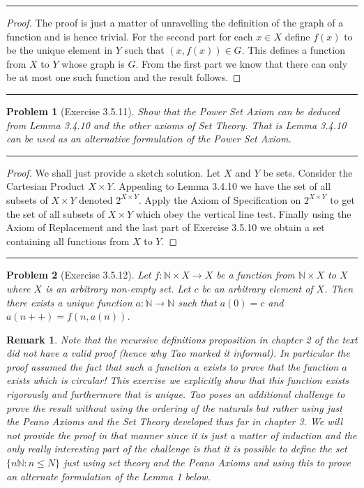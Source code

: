 \documentclass{article}
\newcommand{\lined}{\noindent\rule{\textwidth}{1pt}}
\newtheorem*{problem}{Problem}
\newtheorem*{remark}{Remark}
\begin{document}
	\lined
		\begin{proof}
			The proof is just a matter of unravelling the
			definition of the graph of a function and is hence 
			trivial. For the second part for each $x \in X$ define $f(x)$ to be the unique element in $Y$ such that
			$(x,f(x)) \in G$. This defines a function from $X$ to $Y$ whose graph is $G$. From the first part we know that there can only be at most one such function and the result follows.
		\end{proof}
	\lined
	
	\newpage
	
	\begin{problem}[Exercise 3.5.11]
		Show that the Power Set Axiom can be deduced from Lemma 3.4.10 and the other axioms of Set Theory. That is Lemma 3.4.10 can be used as an alternative formulation of the Power Set Axiom. 
	\end{problem}
	
	\lined
		\begin{proof}
			We shall just provide a sketch solution. Let $X$ and $Y$ be sets. Consider the Cartesian Product $X \times Y$. Appealing to Lemma 3.4.10 we have the set of all subsets of $X \times Y$ denoted $2^{X \times Y}$. Apply the Axiom of Specification on $2^{X \times Y}$ to get the set of all subsets of $X \times Y$ which obey the vertical line test. Finally using the Axiom of Replacement and the last part of Exercise 3.5.10 we obtain a set containing all functions from $X$ to $Y$.
		\end{proof}
	\lined
	
	\newpage
	
	\begin{problem}[Exercise 3.5.12]
		Let $f:\mathbb{N} \times X \rightarrow X$ be a function from $\mathbb{N} \times X$ to $X$ where $X$ is an arbitrary non-empty set. Let $c$ be an arbitrary element of $X$. Then there exists a unique 	function $a:\mathbb{N} \rightarrow \mathbb{N}$ such that $a(0) = c$
		and $a(n++) = f(n, a(n))$. 
	\end{problem}
	
	\begin{remark}
		Note that the recursive definitions proposition in chapter 2 of the text did not have a valid proof (hence why Tao marked it informal). In particular the proof assumed the fact that such a function $a$ exists to prove that the function $a$ exists which is circular! This exercise we explicitly show that this function exists rigorously and furthermore that is unique. Tao poses an additional challenge to prove the result without using the ordering of the naturals but rather using just the Peano Axioms and the Set Theory developed thus far in chapter 3. We will not provide the proof in that manner since it is just a matter of induction and the only really interesting part of the challenge is that it is possible to define the set $\{n \mathbb{N}:n \leq N\}$ just using set theory and the Peano Axioms and using this to prove an alternate formulation of the Lemma 1 below. 
	\end{remark}
	
\end{document}
